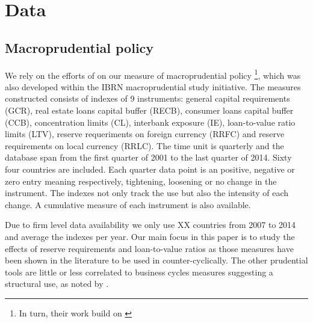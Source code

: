 \documentclass[12pt]{article}
\begin{document}
	\section{Data} \label{sec:data}
	\subsection{Macroprudential policy} \label{subsec:MPI}
	
	We rely on the efforts of \cite*{cerutti2016changes} on our measure of macroprudential policy \footnote{ In turn, their work build on \cite*{cerutti2015use}}, which was also developed within the IBRN macroprudential study initiative. The measures constructed consists of indexes of 9 instruments: general capital requirements (GCR), real estate loans capital buffer (RECB), consumer loans capital buffer (CCB), concentration limits (CL), interbank exposure (IE), loan-to-value ratio limits (LTV), reserve requeriments on foreign currency (RRFC) and reserve requirements on local currency (RRLC). The time unit is quarterly and the database span from the first quarter of 2001 to the last quarter of 2014. Sixty four countries are included. Each quarter data point is an positive, negative or zero entry meaning respectively, tightening, loosening or no change in the instrument. The indexes not only track the use but also the intensity of each change. A cumulative measure of each instrument is also available.    
	
	Due to firm level data availability we only use XX countries from 2007 to 2014 and average the indexes per year. Our main focus in this paper is to study the effects of reserve requirements and loan-to-value ratios as those measures have been shown in the literature to be used in counter-cyclically. The other prudential tools are little or less correlated to business cycles measures suggesting a structural use, as noted by \cite{cerutti2016changes}. 
	
\end{document}
